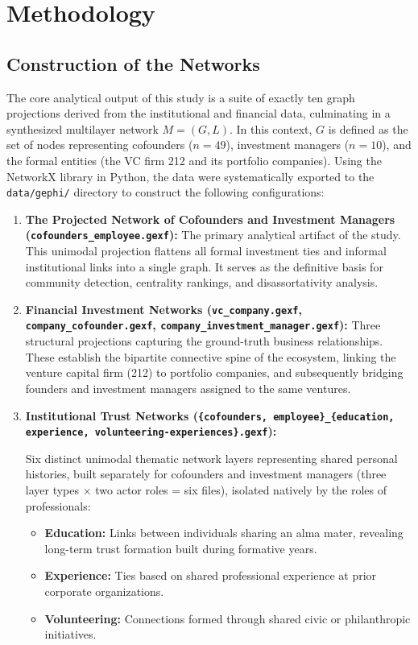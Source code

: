 \documentclass[conference]{IEEEtran}
\begin{document}
\section{Methodology}

\subsection{Construction of the Networks}
\label{subsec:network_constr}
The core analytical output of this study is a suite of exactly ten graph projections derived from the institutional and financial data, culminating in a synthesized multilayer network $M = (G, L)$. In this context, $G$ is defined as the set of nodes representing cofounders ($n=49$), investment managers ($n=10$), and the formal entities (the VC firm 212 and its portfolio companies). Using the NetworkX library in Python, the data were systematically exported to the \texttt{data/gephi/} directory to construct the following configurations:

\begin{enumerate}
    \item{\textbf{The Projected Network of Cofounders and Investment Managers (\texttt{cofounders\_employee.gexf}):}{ The primary analytical artifact of the study. This unimodal projection flattens all formal investment ties and informal institutional links into a single graph. It serves as the definitive basis for community detection, centrality rankings, and disassortativity analysis.}}
    \item{\textbf{Financial Investment Networks (\texttt{vc\_company.gexf}, \texttt{company\_cofounder.gexf}, \texttt{company\_investment\_manager.gexf}):}{ Three structural projections capturing the ground-truth business relationships. These establish the bipartite connective spine of the ecosystem, linking the venture capital firm (212) to portfolio companies, and subsequently bridging founders and investment managers assigned to the same ventures.}}
    \item{\textbf{Institutional Trust Networks (\texttt{\{cofounders, employee\}\_\{education, experience, volunteering-experiences\}.gexf}):}{ Six distinct unimodal thematic network layers representing shared personal histories, built separately for cofounders and investment managers (three layer types $\times$ two actor roles = six files), isolated natively by the roles of professionals:
    \begin{itemize}
        \item{\textbf{Education:}{ Links between individuals sharing an alma mater, revealing long-term trust formation built during formative years.}}
        \item{\textbf{Experience:}{ Ties based on shared professional experience at prior corporate organizations.}}
        \item{\textbf{Volunteering:}{ Connections formed through shared civic or philanthropic initiatives.}}
    \end{itemize}}}
\end{enumerate}
\end{document}
